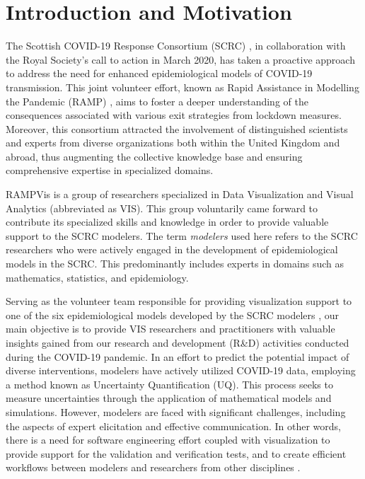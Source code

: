\section{Introduction and Motivation}
\label{sec:intro}

The Scottish COVID-19 Response Consortium (SCRC) \cite{2020University}, in collaboration with the Royal Society's call to action in March 2020, has taken a proactive approach to address the need for enhanced epidemiological models of COVID-19 transmission.
This joint volunteer effort, known as Rapid Assistance in Modelling the Pandemic (RAMP) \cite{2020Rapid}, aims to foster a deeper understanding of the consequences associated with various exit strategies from lockdown measures.
Moreover, this consortium attracted the involvement of distinguished scientists and experts from diverse organizations both within the United Kingdom and abroad, thus augmenting the collective knowledge base and ensuring comprehensive expertise in specialized domains.

RAMPVis \cite{2020Visualization} is a group of researchers specialized in Data Visualization and Visual Analytics (abbreviated as VIS).
This group voluntarily came forward to contribute its specialized skills and knowledge in order to provide valuable support to the SCRC modelers.
The term \textit{modelers} used here refers to the SCRC researchers who were actively engaged in the development of epidemiological models in the SCRC.
This predominantly includes experts in domains such as mathematics, statistics, and epidemiology.

Serving as the volunteer team responsible for providing visualization support to one of the six epidemiological models developed by the SCRC modelers \cite{chen2022RAMPVIS}, our main objective is to provide VIS researchers and practitioners with valuable insights gained from our research and development (R\&D) activities conducted during the COVID-19 pandemic.
In an effort to predict the potential impact of diverse interventions, modelers have actively utilized COVID-19 data, employing a method known as Uncertainty Quantification (UQ).
This process seeks to measure uncertainties through the application of mathematical models and simulations.
However, modelers are faced with significant challenges, including the aspects of expert elicitation and effective communication.
In other words, there is a need for software engineering effort coupled with visualization to provide support for the validation and verification tests, and to create efficient workflows between modelers and researchers from other disciplines \cite{ackland2022Royal}.

